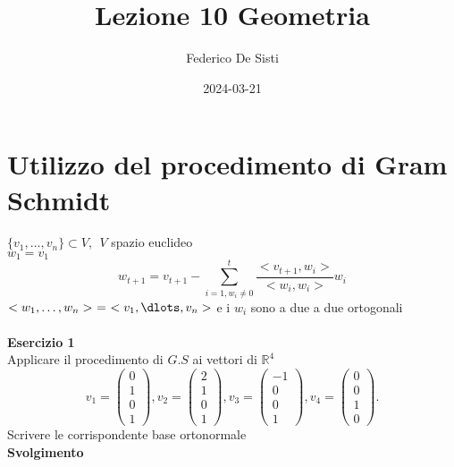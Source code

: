 \documentclass[12px]{article}
\title{Lezione 10 Geometria}
\date{2024-03-21}
\author{Federico De Sisti}
\theoremstyle{break}
\theoremstyle{break}
\theoremstyle{break}
\theoremstyle{break}
\theoremstyle{break}
\theoremstyle{break}
\newcommand{\matrice}[1]{%
  \begin{pmatrix}#1\end{pmatrix}%
}
\begin{document}
	\maketitle
	\newpage
	\section{Utilizzo del procedimento di Gram Schmidt}
	$\{v_1,\ldots,v_n\}\subset V, \ \ V$ spazio euclideo \\
	$w_1 = v_1$ \\
	\[w_{t+1} = v_{t+1} - \sum^t_{i=1, w_i\neq 0}\frac{<v_{t+1},w_i>}{<w_i,w_i>}w_i\]
	$<w_1,\ldots,w_n> \  =  \ <v_1,\dlots,v_n>$
	e i $w_i$ sono a due a due ortogonali\\
	\hline \ \\
	\textbf{Esercizio 1} \\
	Applicare il procedimento di $G.S$ ai vettori di $\mathbb{R}^4$ \\
	\[
		v_1 = \matrice{0\\1\\0\\1}, v_2 = \matrice{2\\1\\0\\1}, v_3 = \matrice{-1\\0\\0\\1}, v_4 = \matrice{0\\0\\1\\0}
	.\] 
	Scrivere le corrispondente base ortonormale\\
	\textbf{Svolgimento}\\
\end{document}
